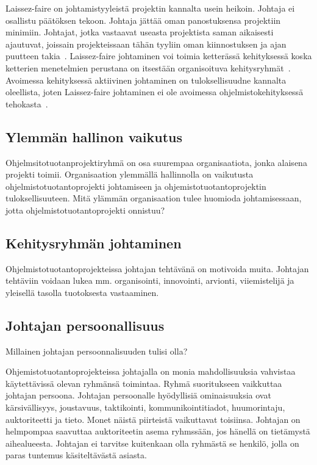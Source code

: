 \documentclass[finnish]{tktltiki2}
\theoremstyle{definition}
\theoremstyle{remark}
\begin{document}
Laissez-faire on johtamistyyleistä projektin kannalta usein heikoin. Johtaja ei osallistu päätöksen tekoon. Johtaja jättää oman panostuksensa projektiin minimiin. Johtajat, jotka vastaavat useasta projektista saman aikaisesti ajautuvat, joissain projekteissaan tähän tyyliin oman kiinnostuksen ja ajan puutteen takia~\cite{Dhomne:2012:ITL:2382887.2382899}. Laissez-faire johtaminen voi toimia ketterässä kehityksessä koska ketterien menetelmien perustana on itsestään organisoituva kehitysryhmät~\cite{fowler2001agile}. Avoimessa kehityksessä aktiivinen johtaminen on tuloksellisuudne kannalta oleellista, joten Laissez-faire johtaminen ei ole avoimessa ohjelmistokehityksessä tehokasta~\cite{Li:2006:MOS:1125170.1125182}.


\subsection{Ylemmän hallinon vaikutus}

Ohjelmsitotuotanprojektiryhmä on osa suurempaa organisaatiota, jonka alaisena projekti toimii. Organisaation ylemmällä hallinnolla on vaikutusta ohjelmistotuotantoprojekti johtamiseen ja ohjemistotuotantoprojektin tuloksellisuuteen. Mitä ylämmän organisaation tulee huomioda johtamisessaan, jotta ohjelmistotuotantoprojekti onnistuu?



\subsection{Kehitysryhmän johtaminen}

Ohjelmistotuotantoprojekteissa johtajan tehtävänä on motivoida muita. Johtajan tehtäviin voidaan lukea mm. organisointi, innovointi, arvionti, viiemistelijä  ja yleisellä tasolla tuotoksesta vastaaminen. ~\cite{4017705}

\subsection{Johtajan persoonallisuus}

Millainen johtajan persoonnalisuuden tulisi olla?

Ohjemistotuotantoprojekteissa johtajalla on monia mahdollisuuksia vahvistaa käytettävissä olevan ryhmänsä toimintaa. Ryhmä suoritukseen vaikkuttaa johtajan persoona. Johtajan persoonalle hyödyllisiä ominaisuuksia ovat kärsivällisyys, joustavuus, taktikointi, kommunikointitiadot, huumorintaju, auktoriteetti ja tieto. Monet näistä piirteistä vaikuttavat toisiinsa. Johtajan on helmpompaa saavuttaa auktoriteetin asema ryhmssään, jos hänellä on tietämystä aihealueesta. Johtajan ei tarvitse kuitenkaan olla ryhmästä se henkilö, jolla on paras tuntemus käsiteltävästä asiasta.~\cite{4017705} 
\end{document}
